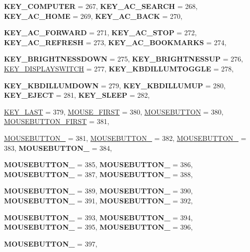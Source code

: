\begin{DoxyCompactItemize}
{\bfseries KEY\_\-COMPUTER} =  267, 
{\bfseries KEY\_\-AC\_\-SEARCH} =  268, 
{\bfseries KEY\_\-AC\_\-HOME} =  269, 
{\bfseries KEY\_\-AC\_\-BACK} =  270, 
\par
{\bfseries KEY\_\-AC\_\-FORWARD} =  271, 
{\bfseries KEY\_\-AC\_\-STOP} =  272, 
{\bfseries KEY\_\-AC\_\-REFRESH} =  273, 
{\bfseries KEY\_\-AC\_\-BOOKMARKS} =  274, 
\par
{\bfseries KEY\_\-BRIGHTNESSDOWN} =  275, 
{\bfseries KEY\_\-BRIGHTNESSUP} =  276, 
\hyperlink{classMezzanine_1_1MetaCode_a3b5633f0145bf3287cf53a3f05b5563caaa1d5d0200c867dae3742208a71b54ed}{KEY\_\-DISPLAYSWITCH} =  277, 
{\bfseries KEY\_\-KBDILLUMTOGGLE} =  278, 
\par
{\bfseries KEY\_\-KBDILLUMDOWN} =  279, 
{\bfseries KEY\_\-KBDILLUMUP} =  280, 
{\bfseries KEY\_\-EJECT} =  281, 
{\bfseries KEY\_\-SLEEP} =  282, 
\par
\hyperlink{classMezzanine_1_1MetaCode_a3b5633f0145bf3287cf53a3f05b5563ca949efdf6fee761bb7ca41fbf37846d0a}{KEY\_\-LAST} =  379, 
\hyperlink{classMezzanine_1_1MetaCode_a3b5633f0145bf3287cf53a3f05b5563caa295a21932423dd5fc830060b73320a3}{MOUSE\_\-FIRST} =  380, 
\hyperlink{classMezzanine_1_1MetaCode_a3b5633f0145bf3287cf53a3f05b5563ca37f08a3b97ecd62bb35b9f35d5d05d8e}{MOUSEBUTTON} =  380, 
\hyperlink{classMezzanine_1_1MetaCode_a3b5633f0145bf3287cf53a3f05b5563ca6e16bc078f673e27b2dd4fbbaf81eb49}{MOUSEBUTTON\_\-FIRST} =  381, 
\par
\hyperlink{classMezzanine_1_1MetaCode_a3b5633f0145bf3287cf53a3f05b5563cabb614dae4717d95dcdd3a6b7f22aa192}{MOUSEBUTTON\_} =  381, 
\hyperlink{classMezzanine_1_1MetaCode_a3b5633f0145bf3287cf53a3f05b5563ca20e84264ed0bfbf984d7e165b713743c}{MOUSEBUTTON\_} =  382, 
\hyperlink{classMezzanine_1_1MetaCode_a3b5633f0145bf3287cf53a3f05b5563ca8c9e9517a74f1ba2cb21f9b6ef11c0a3}{MOUSEBUTTON\_} =  383, 
{\bfseries MOUSEBUTTON\_} =  384, 
\par
{\bfseries MOUSEBUTTON\_} =  385, 
{\bfseries MOUSEBUTTON\_} =  386, 
{\bfseries MOUSEBUTTON\_} =  387, 
{\bfseries MOUSEBUTTON\_} =  388, 
\par
{\bfseries MOUSEBUTTON\_} =  389, 
{\bfseries MOUSEBUTTON\_} =  390, 
{\bfseries MOUSEBUTTON\_} =  391, 
{\bfseries MOUSEBUTTON\_} =  392, 
\par
{\bfseries MOUSEBUTTON\_} =  393, 
{\bfseries MOUSEBUTTON\_} =  394, 
{\bfseries MOUSEBUTTON\_} =  395, 
{\bfseries MOUSEBUTTON\_} =  396, 
\par
{\bfseries MOUSEBUTTON\_} =  397, 

\end{DoxyCompactItemize}
